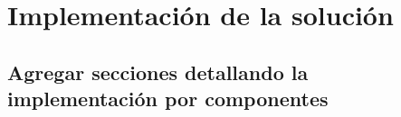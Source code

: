 \chapter{Implementación de la solución}
\label{chapter:implementation}



\section{Agregar secciones detallando la implementación por componentes}
